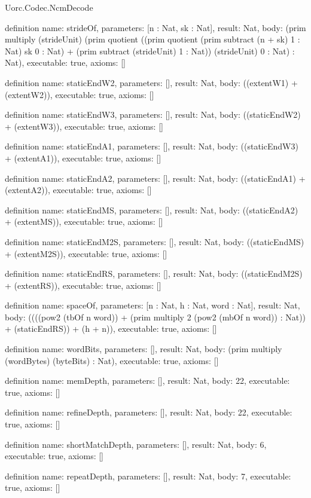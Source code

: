 \begin{lexlean}{Uorc.Codec.NcmDecode}
\begin{semanticmodule}
definition{
  name: strideOf,
  parameters: [n : Nat, sk : Nat],
  result: Nat,
  body: (prim multiply (strideUnit) (prim quotient ((prim quotient (prim subtract (n + sk) 1 : Nat) sk 0 : Nat) + (prim subtract (strideUnit) 1 : Nat)) (strideUnit) 0 : Nat) : Nat),
  executable: true,
  axioms: []
}

definition{
  name: staticEndW2,
  parameters: [],
  result: Nat,
  body: ((extentW1) + (extentW2)),
  executable: true,
  axioms: []
}

definition{
  name: staticEndW3,
  parameters: [],
  result: Nat,
  body: ((staticEndW2) + (extentW3)),
  executable: true,
  axioms: []
}

definition{
  name: staticEndA1,
  parameters: [],
  result: Nat,
  body: ((staticEndW3) + (extentA1)),
  executable: true,
  axioms: []
}

definition{
  name: staticEndA2,
  parameters: [],
  result: Nat,
  body: ((staticEndA1) + (extentA2)),
  executable: true,
  axioms: []
}

definition{
  name: staticEndMS,
  parameters: [],
  result: Nat,
  body: ((staticEndA2) + (extentMS)),
  executable: true,
  axioms: []
}

definition{
  name: staticEndM2S,
  parameters: [],
  result: Nat,
  body: ((staticEndMS) + (extentM2S)),
  executable: true,
  axioms: []
}

definition{
  name: staticEndRS,
  parameters: [],
  result: Nat,
  body: ((staticEndM2S) + (extentRS)),
  executable: true,
  axioms: []
}

definition{
  name: spaceOf,
  parameters: [n : Nat, h : Nat, word : Nat],
  result: Nat,
  body: ((((pow2 (tbOf n word)) + (prim multiply 2 (pow2 (mbOf n word)) : Nat)) + (staticEndRS)) + (h + n)),
  executable: true,
  axioms: []
}

definition{
  name: wordBits,
  parameters: [],
  result: Nat,
  body: (prim multiply (wordBytes) (byteBits) : Nat),
  executable: true,
  axioms: []
}

definition{
  name: memDepth,
  parameters: [],
  result: Nat,
  body: 22,
  executable: true,
  axioms: []
}

definition{
  name: refineDepth,
  parameters: [],
  result: Nat,
  body: 22,
  executable: true,
  axioms: []
}

definition{
  name: shortMatchDepth,
  parameters: [],
  result: Nat,
  body: 6,
  executable: true,
  axioms: []
}

definition{
  name: repeatDepth,
  parameters: [],
  result: Nat,
  body: 7,
  executable: true,
  axioms: []
}


\end{semanticmodule}
\end{lexlean}
